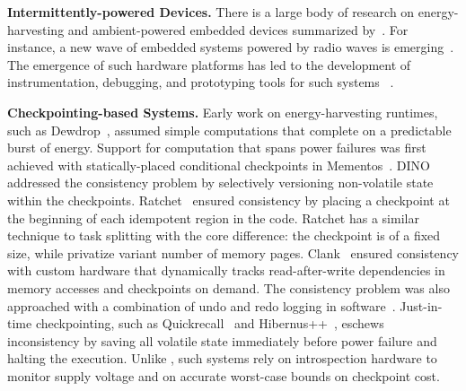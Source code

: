 \textbf{Intermittently-powered Devices.} There is a large body of research on energy-harvesting and ambient-powered embedded devices summarized by~\cite{prasad_comst_2014,sample_procieee_2013,huang:commag:2015,visser_procieee_2013,kamalinejad_commag_2015,ku_cst_2016}. For instance, a new wave of embedded systems powered by radio waves is emerging~\cite{patel_pervasive_2017,rf_powered_computing_gollakota_2014,wisp5,moo,zhao_rfid_2015,holleman_biocas_2008,thomas_jbcs_2012,naderiparizi_rfid_2015,rodriguez_tbcs_2015,liu_sigcomm_2013,kicksat,nadeau_naturebio_2017}. The emergence of such hardware platforms
has led to the development of instrumentation, debugging, and prototyping tools for such systems
~\cite{hester_sensys_2014,hester_sensys_2015,edb,capybara,stork,wisent,flicker}.

\textbf{Checkpointing-based Systems.} Early work on energy-harvesting runtimes, such as Dewdrop~\cite{dewdrop}, assumed simple computations that complete on a predictable burst of energy.
%
%
Support for computation that spans power failures was first achieved with statically-placed conditional checkpoints in Mementos~\cite{mementos}. 
DINO~\cite{dino} addressed the consistency problem by selectively versioning non-volatile state within the checkpoints. Ratchet~\cite{ratchet} ensured consistency by placing a checkpoint at the beginning of each idempotent region in the code. Ratchet has a similar technique to task splitting with the core difference: the checkpoint is of a fixed size, while \sys privatize variant number of memory pages.
%
%
Clank~\cite{hicks_isca_2017} ensured consistency with custom hardware that dynamically tracks read-after-write dependencies in memory accesses and checkpoints on demand. The consistency problem was also approached with a combination of undo and redo logging in software~\cite{baghsorkhi_cgo_2018}. Just-in-time checkpointing, such as Quickrecall~\cite{quickrecall} and Hibernus++~\cite{hibernusplusplus}, eschews inconsistency by saving all volatile state immediately before power failure and halting the execution. Unlike \sys, such systems rely on introspection hardware to monitor supply voltage and on accurate worst-case bounds on checkpoint cost.

